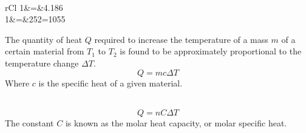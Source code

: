 \documentclass[nobib,notoc]{tufte-handout}
\begin{document}
\begin{defi}
	\,
	\begin{IEEEeqnarray*}{rCl}
		1&=&4.186\\
		1&=&252=1055
	\end{IEEEeqnarray*}
\end{defi}
\begin{defi}
	The quantity of heat \(Q\) required to increase the temperature of a mass \(m\) of a certain material from \(T_1\) to \(T_2\) is found to be approximately proportional to the temperature change \(\Delta T\).
	\begin{equation*}
		Q=mc\Delta T
	\end{equation*}
	Where \(c\) is the specific heat of a given material.
\end{defi}
\begin{defi}
	\,
	\begin{equation*}
	Q=nC\Delta T
	\end{equation*}
	The constant \(C\) is known as the molar heat capacity, or molar specific heat.
\end{defi}
\end{document}
